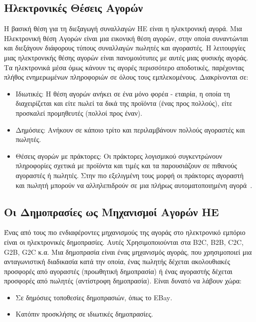 \documentclass[12pt]{report}
\begin{document}
\subsection{Ηλεκτρονικές Θέσεις Αγορών}
Η βασική θέση για τη διεξαγωγή συναλλαγών ΗΕ είναι η ηλεκτρονική αγορά. Μια Ηλεκτρονική θέση Αγορών είναι μια εικονική θέση αγορών, στην οποία συναντώνται και διεξάγουν διάφορους τύπους συναλλαγών πωλητές και αγοραστές. Η λειτουργίες μιας ηλεκτρονικής θέσης αγορών είναι πανομοιότυπες με αυτές μιας φυσικής αγοράς. Τα ηλεκτρονικά μέσα όμως κάνουν τις αγορές περισσότερο αποδοτικές, παρέχοντας πλήθος ενημερωμένων πληροφοριών σε όλους τους εμπλεκομένους. Διακρίνονται σε:
\begin{itemize}
  \item Ιδιωτικές: Η θέση αγορών ανήκει σε ένα μόνο φορέα - εταιρία, η οποία τη διαχειρίζεται και είτε πωλεί τα δικά της προϊόντα (ένας προς πολλούς), είτε προσκαλεί προμηθευτές (πολλοί προς έναν).
  \item Δημόσιες: Ανήκουν σε κάποιο τρίτο και περιλαμβάνουν πολλούς αγοραστές και πωλητές.
  \item Θέσεις αγορών με πράκτορες: Οι πράκτορες λογισμικού συγκεντρώνουν πληροφορίες σχετικά με προϊόντα και τιμές και τα παρουσιάζουν σε πιθανούς αγοραστές ή πωλητές. Στην πιο εξελιγμένη τους μορφή οι πράκτορες αγοραστή και πωλητή μπορούν να αλληλεπιδρούν σε μια πλήρως αυτοματοποιημένη αγορά~\cite{turban_outland_king_lee_liang_turban_2018}.
\end{itemize}

\subsection{Οι Δημοπρασίες ως Μηχανισμοί Αγορών ΗΕ}
Ένας από τους πιο ενδιαφέροντες μηχανισμούς της αγοράς στο ηλεκτρονικό εμπόριο είναι οι ηλεκτρονικές δημοπρασίες. Αυτές Χρησιμοποιούνται στα \textlatin{B2C, B2B, C2C, G2B, G2C} κ.α. Μια δημοπρασία είναι ένας μηχανισμός αγοράς, που χρησιμοποιεί μια ανταγωνιστική διαδικασία κατά την οποία, ένας πωλητής δέχεται ακολουθιακές προσφορές από αγοραστές (προωθητική δημοπρασία) ή ένας αγοραστής δέχεται προσφορές από πωλητές (αντίστροφη δημοπρασία). Είναι δυνατό να λάβουν χώρα:
\begin{itemize}
  \item Σε δημόσιες τοποθεσίες δημοπρασιών, όπως το \textlatin{EBay}.
  \item Κατόπιν προσκλήσης σε ιδιωτικές δημοπρασίες.
\end{itemize}
\end{document}
